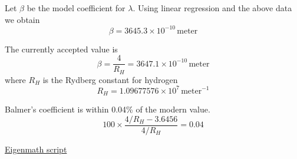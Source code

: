 Let $\beta$ be the model coefficient for $\lambda$.
Using linear regression and the above data we obtain
\begin{equation*}
\beta=3645.3\times10^{-10}\,\text{meter}
\end{equation*}

%
%
%
%
%

The currently accepted value is
\begin{equation*}
\beta=\frac{4}{R_H}=3647.1\times10^{-10}\,\text{meter}
\end{equation*}
where $R_H$ is the Rydberg constant for hydrogen
\begin{equation*}
R_H=1.09677576\times10^7\,\text{meter}^{-1}
\end{equation*}

Balmer's coefficient is within 0.04\% of the modern value.
\begin{equation*}
100\times\frac{4/R_H-3.6456}{4/R_H}=0.04
\end{equation*}

\href{https://georgeweigt.github.io/examples/balmers-formula-demo.html}{Eigenmath script}


